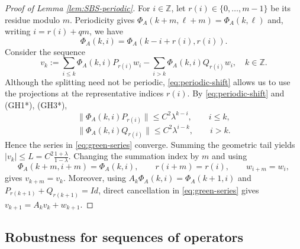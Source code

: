 \documentclass[12pt]{article}
\newcommand{\Zz}{\mathbb{Z}}
\theoremstyle{definition}
\begin{document}
\begin{proof}[Proof of Lemma \ref{lem:SBS-periodic}]

For $i\in\Zz$, let $r(i)\in\{0,\ldots,m-1\}$ be its residue modulo $m$.
Periodicity gives
$
\Phi_A(k+m,\ell+m)=\Phi_A(k,\ell)
$
and, writing $i=r(i)+qm$, we have
\begin{equation}\label{eq:periodic-shift}
\Phi_A(k,i)=\Phi_A(k-i+r(i),r(i)).
\end{equation}
Consider the sequence
\begin{equation}\label{eq:green-series}
v_k:=
\sum_{i \leq k}\Phi_A(k,i)P_{r(i)}w_{i}
-\sum_{ i > k}\Phi_A(k,i)Q_{r(i)}w_{i}, 
\quad k \in \Zz.
\end{equation}
Although the splitting need not be periodic, \eqref{eq:periodic-shift} allows us to use the projections at the representative indices $r(i)$.
By \eqref{eq:periodic-shift} and {\rm(GH1*)}, {\rm(GH3*)},
\[
\|\Phi_A(k,i)P_{r(i)}\|
\leq C^2\lambda^{k-i},
\qquad i\leq k,
\]
\[
\|\Phi_A(k,i)Q_{r(i)}\|
\leq C^2\lambda^{i-k},
\qquad i>k.
\]
Hence the series in \eqref{eq:green-series} converge.  
Summing the geometric tail yields $|v_k| \leq L = C^{2}\frac{1+\lambda}{1-\lambda}$.
Changing the summation index by $m$ and using
\[
\Phi_A(k+m,i+m)=\Phi_A(k,i),\qquad
r(i+m)=r(i),\qquad w_{i+m}=w_i,
\]
gives $v_{k+m}=v_k$. Moreover, using
$
A_k\Phi_A(k,i)=\Phi_A(k+1,i)
$
and $P_{r(k+1)}+Q_{r(k+1)}=Id$, direct cancellation in
\eqref{eq:green-series} gives
$
v_{k+1}=A_kv_k+w_{k+1}.
$
\end{proof}


\subsection{Robustness for sequences of operators}\label{sec:robust-Ak}
\end{document}

